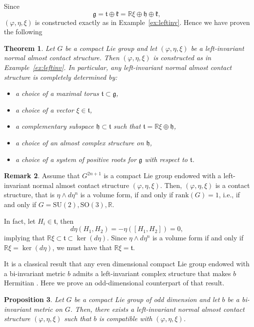 \documentclass{article}
\newtheorem{thm}{Theorem}[section]
\newtheorem{prop}[thm]{Proposition}
\theoremstyle{definition}
\newtheorem{rmk}[thm]{Remark}
\newcommand{\h}{\mathfrak{h}}
\newcommand{\R}{\mathbb{R}}
\renewcommand{\phi}{\varphi}
\numberwithin{equation}{section}
\begin{document}
Since \[\mathfrak g = \mathfrak t \oplus \mathfrak k = \mathbb{R}\xi \oplus \mathfrak h \oplus \mathfrak k,
\]  
$(\phi, \eta, \xi)$ is constructed exactly as in Example~\ref{ex:leftinv}.
Hence we have proven the following
\begin{thm} \label{thm:left-inv_acm}
    Let $G$ be a compact Lie group and let $(\phi, \eta, \xi)$ be a left-invariant normal almost contact structure. 
Then $(\phi, \eta, \xi)$ is constructed as in Example~\ref{ex:leftinv}. 
In particular, any left-invariant normal almost contact structure is completely determined by:
\begin{itemize}
    \item a choice of a maximal torus $\mathfrak{t} \subset \mathfrak g$,
    \item a choice of a vector $\xi \in \mathfrak{t}$,
    \item a complementary subspace $\mathfrak{h} \subset \mathfrak t$ such that $\mathfrak t = \mathbb{R}\xi \oplus \mathfrak{h}$,
    \item a choice of an almost complex structure on $\h$,
    \item a choice of a system of positive roots for $\mathfrak g$ with respect to $\mathfrak t$.
\end{itemize}
\end{thm}
\begin{rmk}
Assume that $G^{2n+1}$ is a compact Lie group endowed with a left-invariant normal almost contact structure $(\phi, \eta, \xi)$. Then, $(\phi, \eta, \xi)$ is a contact structure, that is $\eta \wedge d\eta^n$ is a volume form, if and only if $\mathrm{rank}(G)=1$, i.e., if and only if $G=\mathrm{SU}(2), \mathrm{SO}(3),\R$. \par
In fact, let $H_i \in \mathfrak{t}$, then 
\[
 d \eta(H_1,H_2)=-\eta([H_1,H_2])=0,
\]
implying that $ \R \xi \subset \mathfrak{t} \subset \ker(d\eta)$. Since $\eta \wedge d\eta^n$ is a volume form if and only if $\R \xi= \ker(d\eta)$, we must have that $ \R \xi = \mathfrak{t}$. 
\end{rmk}
It is a classical result that any even dimensional compact Lie group endowed with a bi-invariant metric $b$ admits a left-invariant complex structure that makes $b$ Hermitian \cite{Sam}. Here we prove an odd-dimensional counterpart of that result.
\begin{prop} \label{prop:bi-inv}
    Let $G$ be a compact Lie group of odd dimension and let $b$ be a bi-invariant metric on $G$. Then, there exists a left-invariant normal almost contact structure $(\phi,\eta,\xi)$ such that $b$ is compatible with $(\phi,\eta,\xi)$.
\end{prop}
\end{document}
